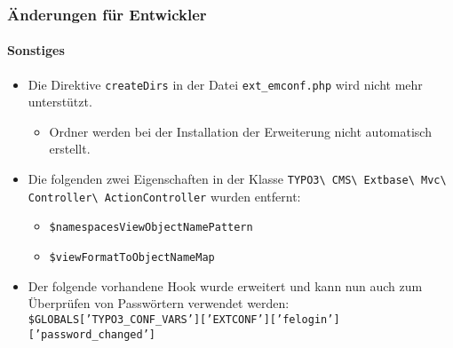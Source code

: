 \begin{frame}[fragile]
	\frametitle{Änderungen für Entwickler}
	\framesubtitle{Sonstiges}

	\begin{itemize}
		\item Die Direktive \texttt{createDirs} in der Datei \texttt{ext\_emconf.php} wird nicht mehr unterstützt.

			\begin{itemize}\smaller
				\item[\ding{228}] Ordner werden bei der Installation der Erweiterung nicht automatisch erstellt.
			\end{itemize}\normalsize

		\item Die folgenden zwei Eigenschaften in der Klasse
			\texttt{TYPO3\textbackslash
				CMS\textbackslash
				Extbase\textbackslash
				Mvc\textbackslash
				Controller\textbackslash
				ActionController}\newline
			wurden entfernt:

			\begin{itemize}
				\item \texttt{\$namespacesViewObjectNamePattern}
				\item \texttt{\$viewFormatToObjectNameMap}
			\end{itemize}

		\item Der folgende vorhandene Hook wurde erweitert und kann nun auch 
			zum Überprüfen von Passwörtern verwendet werden:\newline
			{\fontsize{8}{10} \selectfont \texttt{\$GLOBALS['TYPO3\_CONF\_VARS']['EXTCONF']['felogin']['password\_changed']}}

	\end{itemize}

\end{frame}


